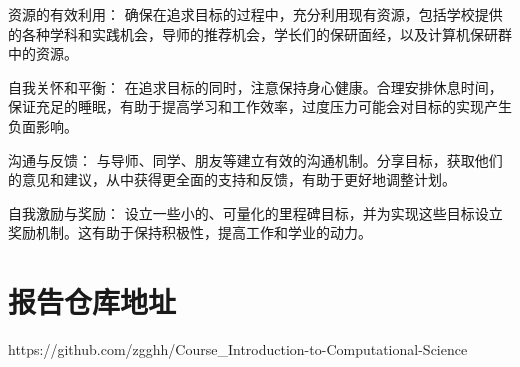 \documentclass{article}
\begin{document}
资源的有效利用： 确保在追求目标的过程中，充分利用现有资源，包括学校提供的各种学科和实践机会，导师的推荐机会，学长们的保研面经，以及计算机保研群中的资源。

自我关怀和平衡： 在追求目标的同时，注意保持身心健康。合理安排休息时间，保证充足的睡眠，有助于提高学习和工作效率，过度压力可能会对目标的实现产生负面影响。

沟通与反馈： 与导师、同学、朋友等建立有效的沟通机制。分享目标，获取他们的意见和建议，从中获得更全面的支持和反馈，有助于更好地调整计划。

自我激励与奖励： 设立一些小的、可量化的里程碑目标，并为实现这些目标设立奖励机制。这有助于保持积极性，提高工作和学业的动力。
\section{报告仓库地址}
https://github.com/zgghh/Course\_Introduction-to-Computational-Science
\end{document}
